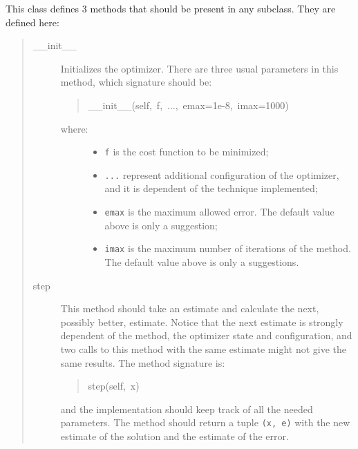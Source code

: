 This class defines 3 methods that should be present in any subclass. They
are defined here:
\begin{quote}
\begin{description}
\item[{{\_}{\_}init{\_}{\_}}] %

Initializes the optimizer. There are three usual parameters in this
method, which signature should be:
\begin{quote}{\ttfamily \raggedright \noindent
{\_}{\_}init{\_}{\_}(self,~f,~...,~emax=1e-8,~imax=1000)
}\end{quote}
\begin{description}
\item[{where:}] %
\begin{itemize}
\item {} 
\texttt{f} is the cost function to be minimized;

\item {} 
\texttt{...} represent additional configuration of the optimizer, and it
is dependent of the technique implemented;

\item {} 
\texttt{emax} is the maximum allowed error. The default value above is
only a suggestion;

\item {} 
\texttt{imax} is the maximum number of iterations of the method. The
default value above is only a suggestions.

\end{itemize}

\end{description}

\item[{step}] %

This method should take an estimate and calculate the next, possibly
better, estimate. Notice that the next estimate is strongly dependent of
the method, the optimizer state and configuration, and two calls to this
method with the same estimate might not give the same results. The
method signature is:
\begin{quote}{\ttfamily \raggedright \noindent
step(self,~x)
}\end{quote}

and the implementation should keep track of all the needed parameters.
The method should return a tuple \texttt{(x, e)} with the new estimate of the
solution and the estimate of the error.


\end{description}
\end{quote}
